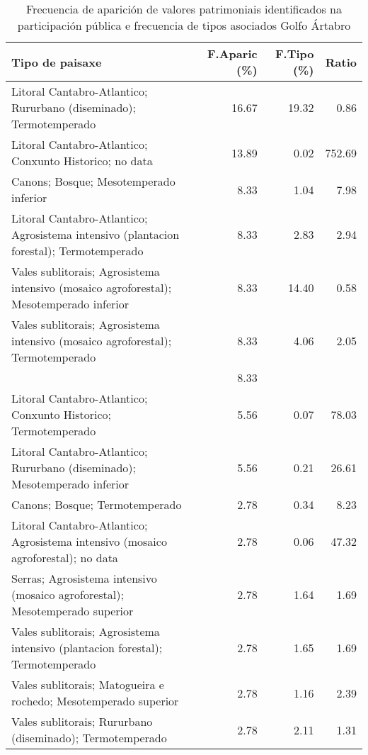 \begin{table}[p]
\centering
\caption{Frecuencia de aparición de valores patrimoniais identificados na participación pública e frecuencia de tipos asociados Golfo Ártabro} 
\label{vsixotpat1}
\begin{tabular}{lrrr}
  \hline
Tipo de paisaxe & F.Aparic (\%) & F.Tipo (\%) & Ratio \\ 
  \hline
Litoral Cantabro-Atlantico; Rururbano (diseminado); Termotemperado & 16.67 & 19.32 & 0.86 \\ 
  Litoral Cantabro-Atlantico; Conxunto Historico; no data & 13.89 & 0.02 & 752.69 \\ 
  Canons; Bosque; Mesotemperado inferior & 8.33 & 1.04 & 7.98 \\ 
  Litoral Cantabro-Atlantico; Agrosistema intensivo (plantacion forestal); Termotemperado & 8.33 & 2.83 & 2.94 \\ 
  Vales sublitorais; Agrosistema intensivo (mosaico agroforestal); Mesotemperado inferior & 8.33 & 14.40 & 0.58 \\ 
  Vales sublitorais; Agrosistema intensivo (mosaico agroforestal); Termotemperado & 8.33 & 4.06 & 2.05 \\ 
   & 8.33 &  &  \\ 
  Litoral Cantabro-Atlantico; Conxunto Historico; Termotemperado & 5.56 & 0.07 & 78.03 \\ 
  Litoral Cantabro-Atlantico; Rururbano (diseminado); Mesotemperado inferior & 5.56 & 0.21 & 26.61 \\ 
  Canons; Bosque; Termotemperado & 2.78 & 0.34 & 8.23 \\ 
  Litoral Cantabro-Atlantico; Agrosistema intensivo (mosaico agroforestal); no data & 2.78 & 0.06 & 47.32 \\ 
  Serras; Agrosistema intensivo (mosaico agroforestal); Mesotemperado superior & 2.78 & 1.64 & 1.69 \\ 
  Vales sublitorais; Agrosistema intensivo (plantacion forestal); Termotemperado & 2.78 & 1.65 & 1.69 \\ 
  Vales sublitorais; Matogueira e rochedo; Mesotemperado superior & 2.78 & 1.16 & 2.39 \\ 
  Vales sublitorais; Rururbano (diseminado); Termotemperado & 2.78 & 2.11 & 1.31 \\ 
   \hline
\end{tabular}
\end{table}
